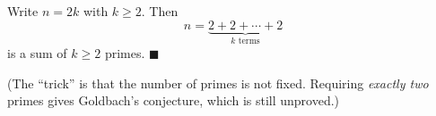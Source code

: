 Write $n=2k$ with $k\ge2$. Then
\[
n=\underbrace{2+2+\cdots+2}_{k\text{ terms}}
\]
is a sum of $k\ge2$ primes. $\blacksquare$

(The ``trick'' is that the number of primes is not fixed. Requiring \emph{exactly two} primes gives Goldbach's conjecture, which is still unproved.)
